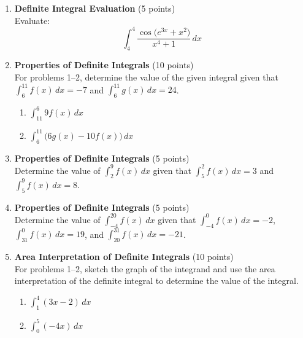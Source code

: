 \begin{enumerate}
  \item \textbf{Definite Integral Evaluation} (5 points)\\
  Evaluate:
  \[
    \int_4^4 \frac{\cos\bigl(e^{3 x} + x^2\bigr)}{x^4 + 1} \,dx
  \]
  \begin{subanswer}
  \end{subanswer}

  \item \textbf{Properties of Definite Integrals} (10 points)\\
  For problems 1--2, determine the value of the given integral given that $\int_6^{11} f(x) \,dx = -7$ and $\int_6^{11} g(x) \,dx = 24$.
  \begin{enumerate}
    \item $\displaystyle \int_{11}^6 9 f(x) \,dx$
    \item $\displaystyle \int_6^{11} \bigl(6 g(x) - 10 f(x)\bigr) \,dx$
  \end{enumerate}
  \begin{subanswer}
  \end{subanswer}

  \item \textbf{Properties of Definite Integrals} (5 points)\\
  Determine the value of $\int_2^9 f(x) \,dx$ given that $\int_5^2 f(x) \,dx = 3$ and $\int_5^9 f(x) \,dx = 8$.
  \begin{subanswer}
  \end{subanswer}

  \item \textbf{Properties of Definite Integrals} (5 points)\\
  Determine the value of $\int_{-4}^{20} f(x) \,dx$ given that $\int_{-4}^0 f(x) \,dx = -2$, $\int_{31}^0 f(x) \,dx = 19$, and $\int_{20}^{31} f(x) \,dx = -21$.
  \begin{subanswer}
  \end{subanswer}

  \item \textbf{Area Interpretation of Definite Integrals} (10 points)\\
  For problems 1--2, sketch the graph of the integrand and use the area interpretation of the definite integral to determine the value of the integral.
  \begin{enumerate}
    \item $\displaystyle \int_1^4 (3 x - 2) \,dx$
    \item $\displaystyle \int_0^5 (-4 x) \,dx$
  \end{enumerate}
  \begin{subanswer}
  \end{subanswer}


\end{enumerate}
